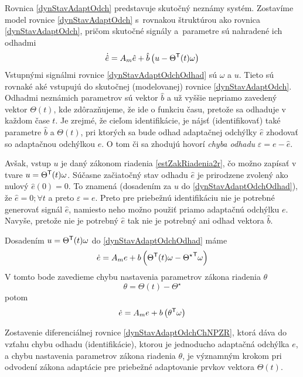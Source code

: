 \documentclass[a4paper, 10pt, ]{article}
\begin{document}
Rovnica \eqref{dynStavAdaptOdch} predstavuje skutočný neznámy systém. Zostavíme model rovnice \eqref{dynStavAdaptOdch} s~rovnakou štruktúrou ako rovnica \eqref{dynStavAdaptOdch}, pričom skutočné signály a~parametre sú nahradené ich odhadmi
\begin{equation} \label{dynStavAdaptOdchOdhad}
    \dot{\hat e} = A_m \hat e + \hat b \left( u - \Theta^{\mathsf{T}}(t) \omega \right)
\end{equation}
Vstupnými signálmi rovnice \eqref{dynStavAdaptOdchOdhad} sú $\omega$ a $u$. Tieto sú rovnaké aké vstupujú do skutočnej (modelovanej) rovnice \eqref{dynStavAdaptOdch}. Odhadmi neznámich parametrov sú vektor $\hat{b}$ a už vyššie nepriamo zavedený vektor $\Theta(t)$, kde zdôrazňujeme, že ide o funkciu času, pretože sa odhaduje v každom čase $t$. Je zrejmé, že cieľom identifikácie, je nájsť (identifikovať) také parametre $\hat{b}$ a ${\Theta}(t)$, pri ktorých sa bude odhad adaptačnej odchýlky $\hat{e}$ zhodovať so  adaptačnou odchýlkou $e$. O tom či sa zhodujú hovorí \emph{chyba odhadu} $\varepsilon = e - \hat e$.

Avšak, vstup $u$ je daný zákonom riadenia \eqref{estZakRiadenia2r}, čo možno zapísať v tvare $u= \Theta^{\mathsf{T}}(t) \omega$. Súčasne začiatočný stav odhadu $\hat e$ je prirodzene zvolený ako nulový $\hat e(0)=0$. To znamená (dosadením za $u$ do \eqref{dynStavAdaptOdchOdhad}), že $\hat e = 0; \forall t$ a preto $\varepsilon = e$. Preto pre priebežnú identifikáciu nie je potrebné generovať signál $\hat e$, namiesto neho možno použiť priamo adaptačnú odchýlku $e$. Navyše, pretože nie je potrebný $\hat e$ tak nie je potrebný ani odhad vektora $\hat b$.

Dosadením $u= \Theta^{\mathsf{T}}(t) \omega$ do \eqref{dynStavAdaptOdchOdhad} máme
\begin{equation} \label{dynStavAdaptOdchDosad}
    \dot e = A_m e + b \left( \Theta^{\mathsf{T}}(t) \omega - {\Theta^\star}^{\mathsf{T}} \omega \right)
\end{equation}
V tomto bode zavedieme chybu nastavenia parametrov zákona riadenia $\theta$
\begin{equation}
    \theta = \Theta(t) - \Theta^\star
\end{equation}
potom
\begin{equation} \label{dynStavAdaptOdchChNPZR}
    \dot e = A_m e + b \left( \theta^{\mathsf{T}} \omega \right)
\end{equation}

Zostavenie diferenciálnej rovnice \eqref{dynStavAdaptOdchChNPZR}, ktorá dáva do vzťahu chybu odhadu (identifikácie), ktorou je jednoducho adaptačná odchýlka $e$, a chybu nastavenia parametrov zákona riadenia $\theta$, je významným krokom pri odvodení zákona adaptácie pre priebežné adaptovanie prvkov vektora $\Theta(t)$.
\end{document}
